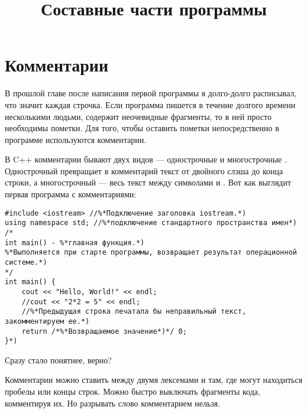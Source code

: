 \documentclass{article}
\begin{document}


\title{\textbf{\Huge Составные части программы}}
\author{}
\date{}

\maketitle 

\section*{Комментарии}

В прошлой главе после написания первой программы я долго-долго расписывал, что значит каждая строчка. Если программа пишется в течение долгого времени несколькими людьми, содержит неочевидные фрагменты, то в ней просто необходимы пометки. Для того, чтобы оставить пометки непосредственно в программе используются комментарии.


В C++ комментарии бывают двух видов --- однострочные \cppword{//} и многострочные \cppword{/**/}. Однострочный превращает в комментарий текст от двойного слэша \cppword{//} до конца строки, а многострочный --- весь текст между символами \cppword{/*} и \cppword{*/}. Вот как выглядит первая программа с комментариями:

\begin{lstlisting}[caption={Программа с комментариями}, captionpos=b, style=cpp]
#include <iostream> //%*Подключение заголовка iostream.*)
using namespace std; //%*подключение стандартного пространства имен*)
/*
int main() - %*главная функция.*)
%*Выполняется при старте программы, возвращает результат операционной системе.*)
*/
int main() {
	cout << "Hello, World!" << endl;
	//cout << "2*2 = 5" << endl;
	//%*Предыдущая строка печатала бы неправильный текст, закомментируем ее.*)
	return /*%*Возвращаемое значение*)*/ 0;
}*)
\end{lstlisting}

Сразу стало понятнее, верно?

Комментарии можно ставить между двумя лексемами и там, где могут находиться пробелы или концы строк. Можно быстро выключать фрагменты кода, комментируя их.  Но разрывать слово комментарием нельзя.
\end{document}
